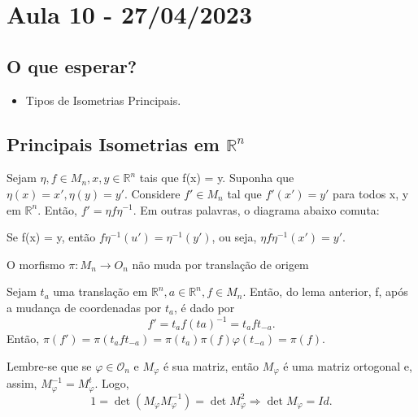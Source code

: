 \documentclass[Algebra/algebra_notes.tex]{subfiles}
\begin{document}
\section{Aula 10 - 27/04/2023}
\subsection{O que esperar?}
\begin{itemize}
	\item Tipos de Isometrias Principais.
\end{itemize}
\subsection{Principais Isometrias em $\mathbb{R}^{n}$}
\begin{lemma*}
	Sejam $\eta, f\in M_{n}, x, y\in \mathbb{R}^{n}$ tais que f(x) = y. Suponha que $\eta(x) = x', \eta(y) = y'.$
	Considere $f'\in M_{n}$ tal que $f'(x')=y'$ para todos x, y em $\mathbb{R}^{n}.$ Então, $f' = \eta f\eta^{-1}$.
	Em outras palavras, o diagrama abaixo comuta:
	\begin{center}
	\end{center}
\end{lemma*}
\begin{proof*}
	Se f(x) = y, então $f\eta ^{-1}(u') = \eta ^{-1}(y')$, ou seja, $\eta f\eta ^{-1}(x')=y'$. \qedsymbol
\end{proof*}
\begin{crl*}
	O morfismo $\pi :M_{n}\rightarrow O_{n}$ não muda por translação de origem
\end{crl*}
\begin{proof*}
	Sejam $t_{a}$ uma translação em $\mathbb{R}^{n}, a\in \mathbb{R}^{n}, f\in M_{n}$. Então, do lema anterior, f,
	após a mudança de coordenadas por $t_{a}$, é dado por
	$$
		f'=t_{a}f(ta)^{-1} = t_{a}ft_{-a}.
	$$
	Então, $\pi (f') = \pi (t_{a}ft_{-a}) = \pi (t_{a})\pi (f)\varphi (t_{-a}) = \pi (f).$ \qedsymbol
\end{proof*}
Lembre-se que se $\varphi \in \mathcal{O}_{n}$ e $M_{\varphi }$ é sua matriz, então $M_{\varphi }$ é uma matriz ortogonal e,
assim, $M_{\varphi }^{-1} = M_{\varphi }^{t}.$ Logo,
$$
	1 = \det{(M_{\varphi }M_{\varphi }^{-1})} = \det{M_{\varphi }^{2}} \Rightarrow \det{M_{\varphi }} = Id.
$$
\end{document}

